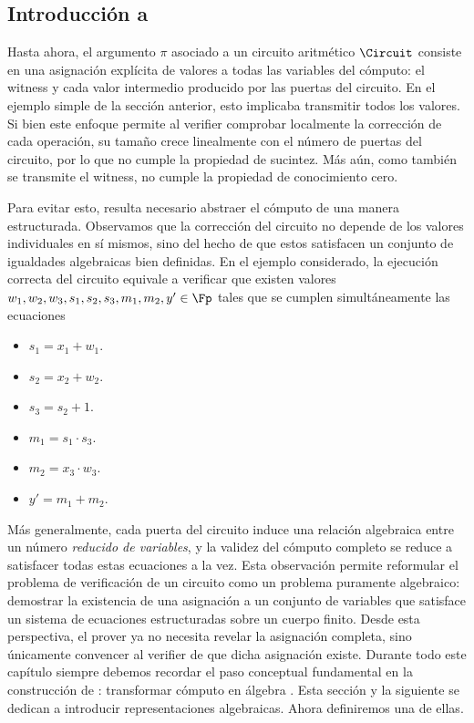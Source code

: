 
\subsection{Introducción a \ROneCS}

Hasta ahora, el argumento $\pi$ asociado a un circuito aritmético $\Circuit$ consiste en una asignación explícita de valores a todas las variables del cómputo: el witness y cada valor intermedio producido por las puertas del circuito. En el ejemplo simple de la sección anterior, esto implicaba transmitir todos los valores. Si bien este enfoque permite al verifier comprobar localmente la corrección de cada operación, su tamaño crece linealmente con el número de puertas del circuito, por lo que no cumple la propiedad de sucintez. Más aún, como también se transmite el witness, no cumple la propiedad de conocimiento cero.

Para evitar esto, resulta necesario abstraer el cómputo de una manera estructurada. Observamos que la corrección del circuito no depende de los valores individuales en sí mismos, sino del hecho de que estos satisfacen un conjunto de igualdades algebraicas bien definidas. En el ejemplo considerado, la ejecución correcta del circuito equivale a verificar que existen valores $w_1, w_2, w_3, s_1, s_2, s_3, m_1, m_2, y' \in \Fp$ tales que se cumplen simultáneamente las ecuaciones
\begin{itemize}[noitemsep]
	\item $s_1 = x_1 + w_1$.
	\item $s_2 = x_2 + w_2$.
	\item $s_3 = s_2 + 1$.
	\item $m_1 = s_1 \cdot s_3$.
	\item $m_2 = x_3 \cdot w_3$.
	\item $y' = m_1 + m_2$.
\end{itemize}

Más generalmente, cada puerta del circuito induce una relación algebraica entre un número \textit{reducido de variables}, y la validez del cómputo completo se reduce a satisfacer todas estas ecuaciones a la vez. Esta observación permite reformular el problema de verificación de un circuito como un problema puramente algebraico: demostrar la existencia de una asignación a un conjunto de variables que satisface un sistema de ecuaciones estructuradas sobre un cuerpo finito. Desde esta perspectiva, el prover ya no necesita revelar la asignación completa, sino únicamente convencer al verifier de que dicha asignación existe. Durante todo este capítulo siempre debemos recordar el paso conceptual fundamental en la construcción de \SNARK: transformar cómputo en álgebra \cite{Gennaro2013, Parno2016}. Esta sección y la siguiente se dedican a introducir representaciones algebraicas. Ahora definiremos una de ellas.

